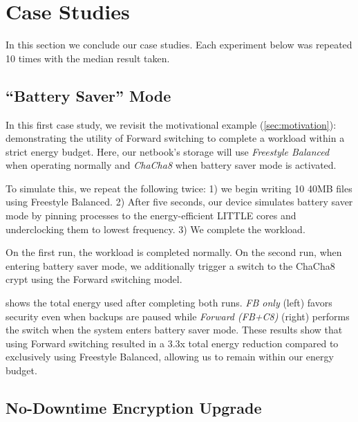\section{Case Studies}\label{sec:usecases}

In this section we conclude our case studies. Each experiment below was repeated
10 times with the median result taken.


\subsection{``Battery Saver'' Mode}\label{subsec:usecase-battery}

In this first case study, we revisit the motivational example
(\cref{sec:motivation}): demonstrating the utility of Forward switching to
complete a workload within a strict energy budget. Here, our netbook's storage
will use {\em Freestyle Balanced} when operating normally and {\em ChaCha8} when
battery saver mode is activated.

To simulate this, we repeat the following twice: 1) we begin writing 10 40MB
files using Freestyle Balanced. 2) After five seconds, our device simulates
battery saver mode by pinning \sys processes to the energy-efficient LITTLE
cores and underclocking them to lowest frequency. 3) We complete the workload.



On the first run, the workload is completed normally. On the second run, when
entering battery saver mode, we additionally trigger a switch to the ChaCha8
crypt using the Forward switching model.

 shows the total energy used after completing both
runs. {\em FB only} (left) favors security even when backups are paused while
{\em Forward (FB+C8)} (right) performs the switch when the system enters battery
saver mode. These results show that using Forward switching resulted in a 3.3x
total energy reduction compared to exclusively using Freestyle Balanced,
allowing us to remain within our energy budget.


\subsection{No-Downtime Encryption Upgrade}\label{subsec:usecase-upgrade}


